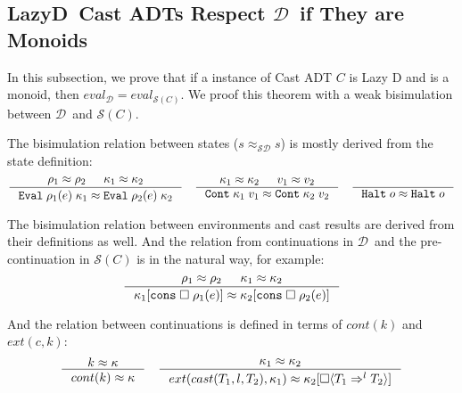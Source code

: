\documentclass[acmsmall,review,anonymous]{acmart}\settopmatter{printfolios=true,printccs=false,printacmref=false}
\newcommand{\lazyD}{Lazy\;D}
\newcommand{\sOOinspect}[3]{\mathtt{Eval} \; #2(#1) \; #3}
\newcommand{\sOOreturn}[2]{\mathtt{Cont} \; #2 \; #1}
\newcommand{\sOOhalt}[1]{\mathtt{Halt} \; #1}
\newcommand{\cOOcast}[3]{#1 \Rightarrow^{#2} #3}
\newcommand{\kOOconsI}[3]{#3[\mathtt{cons} \; \square \; #2(#1) ]}
\newcommand{\kOOcast}[2]{
	#2[\square \langle #1 \rangle]}
\newcommand{\eqvSD}[3]{#2 \approx_{\mathcal{SD}} #3}
\newcommand{\ineffCEKD}{$ \mathcal{D} $}
\newcommand{\effCEK}[1]{$ \mathcal{S}(#1) $}
\begin{document}
\subsection{\lazyD\ Cast ADTs Respect \ineffCEKD\ if They are 
Monoids}
\label{secc:framework:monoid-correct}

In this subsection, we prove that if a instance of Cast ADT $ C $ is Lazy D and 
is a monoid, then $ eval_\mathcal{D} = eval_{\mathcal{S}(C)} $. We proof this 
theorem with a weak bisimulation between \ineffCEKD\ and 
\effCEK{C}. 

The bisimulation relation between states ($\eqvSD{C}{s}{s}$) is mostly derived 
from the state definition: \begin{gather*}
\inference{
	\rho_1 \approx \rho_2 &
	\kappa_1 \approx \kappa_2
}{
	\sOOinspect{e}{\rho_1}{\kappa_1} \approx \sOOinspect{e}{\rho_2}{\kappa_2}
}
\quad
\inference{
	\kappa_1 \approx \kappa_2 &
	v_1 \approx v_2
}{
	\sOOreturn{v_1}{\kappa_1} \approx \sOOreturn{v_2}{\kappa_2}
}
\quad
\inference{
}{
	\sOOhalt{o} \approx \sOOhalt{o}
}
\end{gather*}

The bisimulation relation between environments and cast results are derived 
from their definitions as well. And the relation from continuations in 
\ineffCEKD\ and the pre-continuation in \effCEK{C} is in the natural way, for 
example: \begin{gather*}
\inference{
	\rho_1 \approx \rho_2 &
	\kappa_1 \approx \kappa_2
}{
	\kOOconsI{e}{\rho_1}{\kappa_1} \approx \kOOconsI{e}{\rho_2}{\kappa_2}
}
\end{gather*}

And the relation between continuations is defined in terms of $ cont(k) $ and $ 
ext(c,k) $: \begin{gather*}
\inference{
	k \approx \kappa
}{
	cont(k) \approx \kappa
}
\quad
\inference{
	\kappa_1 \approx \kappa_2
}{
	ext(cast(T_1,l,T_2),\kappa_1)
	\approx
	\kOOcast{\cOOcast{T_1}{l}{T_2}}{\kappa_2} 
}
\end{gather*}
\end{document}
